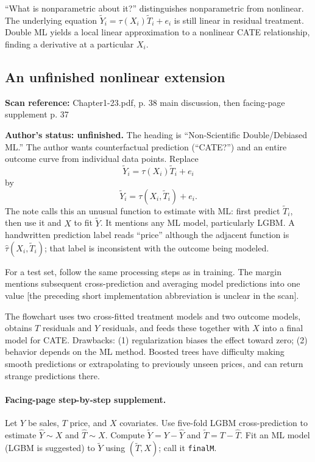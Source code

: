 \documentclass[11pt,a4paper]{article}
\newcommand{\sourcepages}[1]{\par{\small\sffamily\color{muted}\textbf{Scan reference:} #1\par}\nobreak\smallskip\nopagebreak[4]}
\begin{document}
{``What is nonparametric about it?'' distinguishes nonparametric from nonlinear. The underlying equation $\widetilde Y_i=\tau(X_i)\widetilde T_i+e_i$ is still linear in residual treatment. Double ML yields a local linear approximation to a nonlinear CATE relationship, finding a derivative at a particular $X_i$.

\subsection{An unfinished nonlinear extension}
\sourcepages{Chapter1-23.pdf, p. 38 main discussion, then facing-page supplement p. 37}
\textbf{Author's status: unfinished.} The heading is ``Non-Scientific Double/Debiased ML.'' The author wants counterfactual prediction (``CATE?'') and an entire outcome curve from individual data points. Replace
\[\widetilde Y_i=\tau(X_i)\widetilde T_i+e_i\]
by
\[\widetilde Y_i=\tau(X_i,\widetilde T_i)+e_i.\]
The note calls this an unusual function to estimate with ML: first predict $\widetilde T_i$, then use it and $X$ to fit $\widetilde Y$. It mentions any ML model, particularly LGBM. A handwritten prediction label reads ``price'' although the adjacent function is $\hat\tau(X_i,\widetilde T_i)$; that label is inconsistent with the outcome being modeled.

For a test set, follow the same processing steps as in training. The margin mentions subsequent cross-prediction and averaging model predictions into one value [the preceding short implementation abbreviation is unclear in the scan].

The flowchart uses two cross-fitted treatment models and two outcome models, obtains $T$ residuals and $Y$ residuals, and feeds these together with $X$ into a final model for CATE. Drawbacks: (1) regularization biases the effect toward zero; (2) behavior depends on the ML method. Boosted trees have difficulty making smooth predictions or extrapolating to previously unseen prices, and can return strange predictions there.

\paragraph{Facing-page step-by-step supplement.}
Let $Y$ be sales, $T$ price, and $X$ covariates. Use five-fold LGBM cross-prediction to estimate $\hat Y\sim X$ and $\hat T\sim X$. Compute $\widetilde Y=Y-\hat Y$ and $\widetilde T=T-\hat T$. Fit an ML model (LGBM is suggested) to $\widetilde Y$ using $(\widetilde T,X)$; call it \texttt{finalM}.

}
\end{document}
